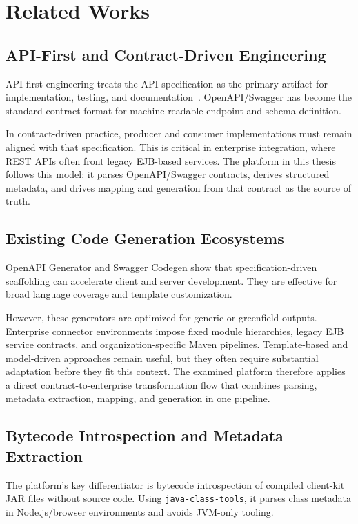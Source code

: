 \chapter{Related Works}

\section{API-First and Contract-Driven Engineering}

API-first engineering treats the API specification as the primary artifact for implementation, testing, and documentation~\cite{openapi_spec}. OpenAPI/Swagger has become the standard contract format for machine-readable endpoint and schema definition.

In contract-driven practice, producer and consumer implementations must remain aligned with that specification. This is critical in enterprise integration, where REST APIs often front legacy EJB-based services. The platform in this thesis follows this model: it parses OpenAPI/Swagger contracts, derives structured metadata, and drives mapping and generation from that contract as the source of truth.

\section{Existing Code Generation Ecosystems}

OpenAPI Generator and Swagger Codegen show that specification-driven scaffolding can accelerate client and server development. They are effective for broad language coverage and template customization.

However, these generators are optimized for generic or greenfield outputs. Enterprise connector environments impose fixed module hierarchies, legacy EJB service contracts, and organization-specific Maven pipelines. Template-based and model-driven approaches remain useful, but they often require substantial adaptation before they fit this context. The examined platform therefore applies a direct contract-to-enterprise transformation flow that combines parsing, metadata extraction, mapping, and generation in one pipeline.

\section{Bytecode Introspection and Metadata Extraction}

The platform's key differentiator is bytecode introspection of compiled client-kit JAR files without source code. Using \texttt{java-class-tools}, it parses class metadata in Node.js/browser environments and avoids JVM-only tooling.

